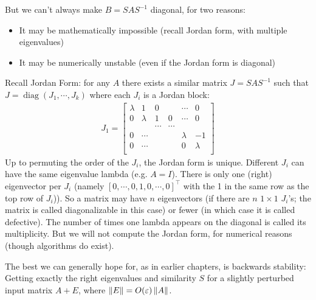 \documentclass[11pt]{article}
\numberwithin{equation}{section}
\begin{document}
But we can't always make $B = SAS^{-1}$ diagonal, for two reasons:\begin{itemize}
    \item It may be mathematically impossible (recall Jordan form, with multiple eigenvalues)
    \item It may be numerically unstable (even if the Jordan form is diagonal)
\end{itemize}

Recall Jordan Form: for any $A$ there exists a similar matrix $J = SAS^{-1}$ such that $J=\operatorname{diag}\left( J_1, \cdots, J_k \right)$ where each $J_i$ is a Jordan block: \begin{align*}
    J_1 = \left[\begin{array}{llllll}
        \lambda & 1 & 0 & & \cdots & 0 \\
        0 & \lambda & 1 & 0 & \cdots & 0 \\
        & & \cdots & \cdots & & \\
        0 & \cdots & & & \lambda & -1 \\
        0 & \cdots & & & 0 & \lambda \\
        \end{array}\right]
\end{align*}
Up to permuting the order of the $J_i$, the Jordan form is unique. Different $J_i$ can have the same eigenvalue lambda (e.g. $A = I$).
There is only one (right) eigenvector per $J_i$ (namely $[ 0, \cdots , 0,1,0, \cdots, 0]^\top$ with the 1 in the same row as the top row of $J_i$)).
So a matrix may have $n$ eigenvectors (if there are $n$ $1\times 1$ $J_i$'s; the matrix is called diagonalizable in this case) or fewer (in which case it is called defective).
The number of times one lambda appears on the diagonal is called its multiplicity. But we will not compute the Jordan form, for numerical reasons (though algorithms do exist). 

The best we can generally hope for, as in earlier chapters, is backwards stability: 
Getting exactly the right eigenvalues and similarity $S$ for a slightly perturbed
input matrix $A + E$, where $\left\| E \right\|=O(\varepsilon)\left\| A \right\|$.
\end{document}
